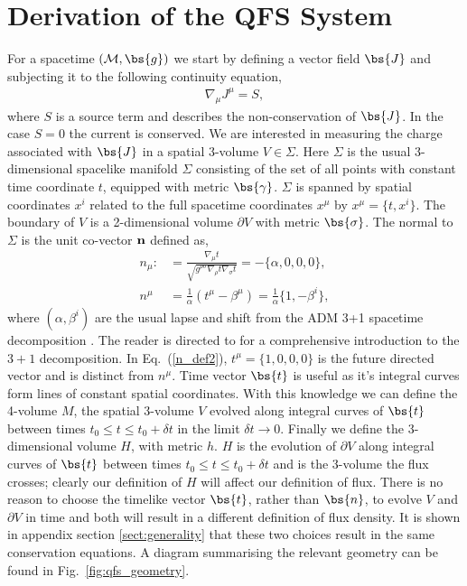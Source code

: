 \section{Derivation of the QFS System} \label{sect:derive}
For a spacetime $(\mathcal{M},\bs{g})$ we start by defining a vector field $\bs{J}$ and subjecting it to the following continuity equation,
\begin{align}
\label{continuity_eqn_def}\nabla_\mu J^\mu = S,
\end{align}
where $S$ is a source term and describes the non-conservation of $\bs{J}$. In the case $S=0$ the current is conserved. We are interested in measuring the charge associated with $\bs{J}$ in a spatial 3-volume $V\in\Sigma$. Here $\Sigma$ is the usual 3-dimensional spacelike manifold $\Sigma$ consisting of the set of all points with constant time coordinate $t$, equipped with metric $\bs{\gamma}$. $\Sigma$ is spanned by spatial coordinates $x^i$ related to the full spacetime coordinates $x^\mu$ by $ x^\mu = \{t,x^i \}$. The boundary of $V$ is a 2-dimensional volume $\partial V$ with metric $\bs{\sigma}$. The normal to $\Sigma$ is the unit co-vector $\bf{n}$ defined as, 
\begin{align}
\label{n_def}
n_\mu :&= \frac{\nabla_\mu t}{\sqrt{g^{\rho\sigma}\nabla_\rho t \nabla_\sigma t}} = -\{\alpha,0,0,0\}, \\
\label{n_def2} n^\mu &= \frac{1}{\alpha}\left(t^\mu - \beta^\mu \right)= \frac{1}{\alpha} \{1, -\beta^i \} , 
\end{align} 
where $(\alpha,\beta^i)$ are the usual lapse and shift from the ADM 3+1 spacetime decomposition \cite{2008}. The reader is directed to \cite{gourgoulhon20073+} for a comprehensive introduction to the $3+1$ decomposition. In Eq.~(\ref{n_def2}), $t^\mu = \{1,0,0,0\}$ is the future directed vector and is distinct from $n^\mu$. Time vector $\bs{t}$ is useful as it's integral curves form lines of constant spatial coordinates. With this knowledge we can define the 4-volume $M$, the spatial 3-volume $V$ evolved along integral curves of $\bs{t}$ between times $t_0\leq t\leq t_0 + \delta t$ in the limit $\delta t\rightarrow 0$. Finally we define the 3-dimensional volume $H$, with metric $h$. $H$ is the evolution of $\partial V$ along integral curves of $\bs{t}$ between times $t_0\leq t \leq t_0 + \delta t$ and is the 3-volume the flux crosses; clearly our definition of $H$ will affect our definition of flux. There is no reason to choose the timelike vector $\bs{t}$, rather than $\bs{n}$, to evolve $V$ and $\partial V$ in time and both will result in a different definition of flux density. It is shown in appendix section \ref{sect:generality} that these two choices result in the same conservation equations. A diagram summarising the relevant geometry can be found in Fig.~\ref{fig:qfs_geometry}.

